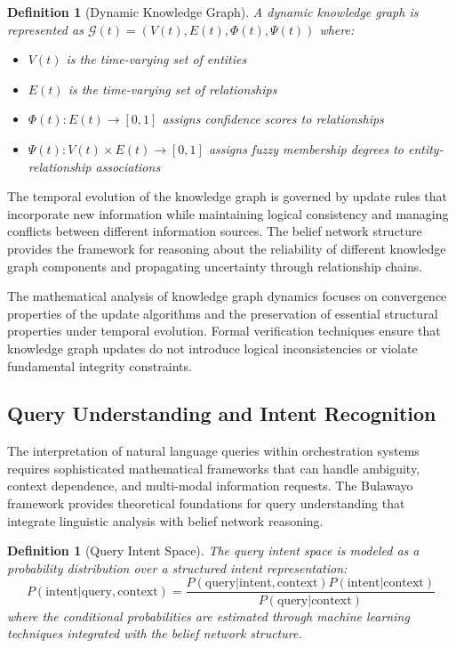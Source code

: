 \documentclass[12pt,a4paper]{article}
\newtheorem{definition}[theorem]{Definition}
\begin{document}
{{{\begin{definition}[Dynamic Knowledge Graph]
A dynamic knowledge graph is represented as $\mathcal{G}(t) = (V(t), E(t), \Phi(t), \Psi(t))$ where:
\begin{itemize}
\item $V(t)$ is the time-varying set of entities
\item $E(t)$ is the time-varying set of relationships
\item $\Phi(t) : E(t) \rightarrow [0,1]$ assigns confidence scores to relationships
\item $\Psi(t) : V(t) \times E(t) \rightarrow [0,1]$ assigns fuzzy membership degrees to entity-relationship associations
\end{itemize}
\end{definition}

The temporal evolution of the knowledge graph is governed by update rules that incorporate new information while maintaining logical consistency and managing conflicts between different information sources. The belief network structure provides the framework for reasoning about the reliability of different knowledge graph components and propagating uncertainty through relationship chains.

The mathematical analysis of knowledge graph dynamics focuses on convergence properties of the update algorithms and the preservation of essential structural properties under temporal evolution. Formal verification techniques ensure that knowledge graph updates do not introduce logical inconsistencies or violate fundamental integrity constraints.

\subsection{Query Understanding and Intent Recognition}

The interpretation of natural language queries within orchestration systems requires sophisticated mathematical frameworks that can handle ambiguity, context dependence, and multi-modal information requests. The Bulawayo framework provides theoretical foundations for query understanding that integrate linguistic analysis with belief network reasoning.

\begin{definition}[Query Intent Space]
The query intent space is modeled as a probability distribution over a structured intent representation:
\begin{equation}
P(\text{intent} | \text{query}, \text{context}) = \frac{P(\text{query} | \text{intent}, \text{context}) P(\text{intent} | \text{context})}{P(\text{query} | \text{context})}
\end{equation}
where the conditional probabilities are estimated through machine learning techniques integrated with the belief network structure.
\end{definition}

}}}
\end{document}
